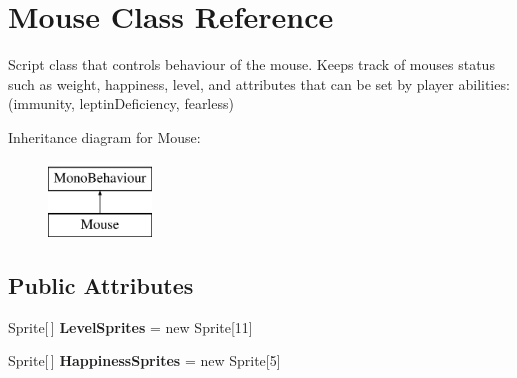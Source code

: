 \hypertarget{class_mouse}{}\section{Mouse Class Reference}
\label{class_mouse}


Script class that controls behaviour of the mouse. Keeps track of mouses status such as weight, happiness, level, and attributes that can be set by player abilities\+: (immunity, leptin\+Deficiency, fearless)  


Inheritance diagram for Mouse\+:\begin{figure}[H]
\begin{center}
\leavevmode
\includegraphics[height=2.000000cm]{class_mouse}
\end{center}
\end{figure}
\subsection*{Public Attributes}
\begin{DoxyCompactItemize}
\item 
Sprite\mbox{[}$\,$\mbox{]} {\bfseries Level\+Sprites} = new Sprite\mbox{[}11\mbox{]}\hypertarget{class_mouse_a215f93e37bb5d78b3890c79507461f1f}{}\label{class_mouse_a215f93e37bb5d78b3890c79507461f1f}

\item 
Sprite\mbox{[}$\,$\mbox{]} {\bfseries Happiness\+Sprites} = new Sprite\mbox{[}5\mbox{]}\hypertarget{class_mouse_a4c4febebe798e39398129c308a3b7c70}{}\label{class_mouse_a4c4febebe798e39398129c308a3b7c70}

\end{DoxyCompactItemize}
